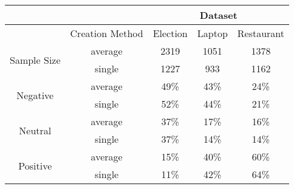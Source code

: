 \begin{tabular}{|c|c|c|c|c|}
\hline
& & \multicolumn{3}{c|}{Dataset} \\
\hline
& Creation Method &  Election &  Laptop &  Restaurant \\
\hline
\multirow{2}{*}{Sample Size} & average &    2319 &  1051 &      1378 \\
& single &    1227 &   933 &      1162 \\
\hline
\multirow{2}{*}{Negative} & average &      49\% &    43\% &        24\% \\         
& single &      52\% &    44\% &        21\% \\
\hline
\multirow{2}{*}{Neutral} & average &      37\% &    17\% &        16\% \\         
& single &      37\% &    14\% &        14\% \\
\hline
\multirow{2}{*}{Positive} & average &      15\% &    40\% &        60\% \\         
& single &      11\% &    42\% &        64\% \\
\hline
\end{tabular}